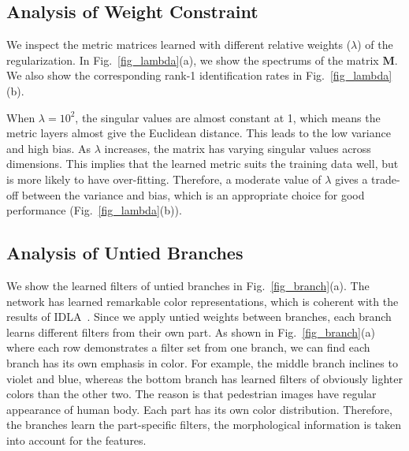 \documentclass[runningheads]{llncs}
\begin{document}
\subsection{Analysis of Weight Constraint}
\label{section_Analysis of Weight Constraint}

We inspect the metric matrices learned with different relative weights ($\lambda$) of the regularization.
In Fig.~\ref{fig_lambda}(a), we show the spectrums of the matrix $\textbf{M}$.
We also show the corresponding rank-1 identification rates in Fig.~\ref{fig_lambda}(b).

When $\lambda = 10^2$, the singular values are almost constant at 1, which means the metric layers almost give the Euclidean distance. This leads to the low variance and high bias.
As $\lambda$ increases, the matrix has varying singular values across dimensions.
This implies that the learned metric suits the training data well, but is more likely to have over-fitting.
Therefore, a moderate value of $\lambda$ gives a trade-off between the variance and bias, which is an appropriate choice for good performance (Fig.~\ref{fig_lambda}(b)).

\begin{figure*}[!h]
  \centering
  \hspace{2pt}


  \caption{(a) The spectrums of the matrix $\textbf{M}$. The spectrums with $\lambda=10^1, 10^0$ are very close; those with $\lambda=10^{-3}, 10^{-4}, 0$ are also very close. Best viewed in color.
  (b) The rank-1 identification rates with different $\lambda$ of the weight constraint. }
  \label{fig_lambda}
\end{figure*}






\subsection{Analysis of Untied Branches}
\label{section_Analysis of Untied Branches}

We show the learned filters of untied branches in Fig.~\ref{fig_branch}(a).
The network has learned remarkable color representations, which is coherent with the results of IDLA~\cite{ahmed2015improved}.
Since we apply untied weights between branches, each branch learns different filters from their own part.
As shown in Fig.~\ref{fig_branch}(a) where each row demonstrates a filter set from one branch,
we can find each branch has its own emphasis in color.
For example, the middle branch inclines to violet and blue, whereas the bottom branch has learned filters of obviously lighter colors than the other two.
The reason is that pedestrian images have regular appearance of human body.
Each part has its own color distribution.
Therefore, the branches learn the part-specific filters, the morphological information is taken into account for the features.
\end{document}
